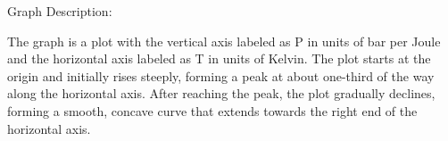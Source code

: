 Graph Description:

The graph is a plot with the vertical axis labeled as P in units of bar per Joule and the horizontal axis labeled as T in units of Kelvin. The plot starts at the origin and initially rises steeply, forming a peak at about one-third of the way along the horizontal axis. After reaching the peak, the plot gradually declines, forming a smooth, concave curve that extends towards the right end of the horizontal axis.